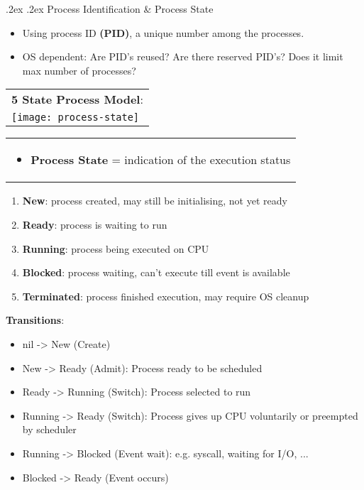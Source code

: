 \documentclass[10pt,landscape,a4paper]{article}
\makeatletter
\renewcommand{\subsection}{\@startsection{subsection}{1}{0mm}%
  {.2ex}%
  {.2ex}%
{\sffamily\bfseries}}
\makeatother
\begin{document}
\begin{multicols*}{4}
  \subsection{Process Identification \& Process State}
  \begin{itemize}
    \item Using process ID \textbf{(PID)}, a unique number among the processes.
    \item OS dependent: Are PID's reused? Are there reserved PID's? Does it limit max number of processes?
  \end{itemize}
  \begin{tabular}{l}
    \textbf{5 State Process Model}:\\
    \texttt{[image: process-state]}
  \end{tabular}
  \begin{tabularx}{0.4\columnwidth}{X}
  \begin{itemize}
    \item \textbf{Process State} = indication of the execution status
  \end{itemize}
  \end{tabularx}
  \begin{enumerate}
    \item \textbf{New}: process created, may still be initialising, not yet ready
    \item \textbf{Ready}: process is waiting to run
    \item \textbf{Running}: process being executed on CPU
    \item \textbf{Blocked}: process waiting, can't execute till event is available
    \item \textbf{Terminated}: process finished execution, may require OS cleanup
  \end{enumerate}
  \textbf{Transitions}:
  \begin{itemize}
    \item nil -> New (Create)
    \item New -> Ready (Admit): Process ready to be scheduled
    \item Ready -> Running (Switch): Process selected to run
    \item Running -> Ready (Switch): Process gives up CPU voluntarily or preempted by scheduler
    \item Running -> Blocked (Event wait): e.g. syscall, waiting for I/O, ...
    \item Blocked -> Ready (Event occurs)
  \end{itemize}

\end{multicols*}
\end{document}
